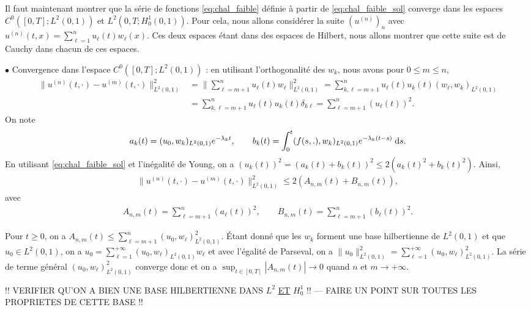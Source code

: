 \documentclass[12pt,a4paper,twoside]{article}
\begin{document}
Il faut maintenant montrer que la s\'erie de fonctions \eqref{eq:chal_faible}
d\'efinie \`a partir de \eqref{eq:chal_faible_sol} converge
dans les espaces $C^0([0,T];L^2(0,1))$ et $L^2(0,T;H^1_0(0,1))$.
Pour cela, nous allons consid\'erer la suite 
$(u^{(n)})_n$ avec $u^{(n)}(t,x) = \sum_{\ell=1}^n u_{\ell}(t) w_{\ell}(x)$. 
Ces deux espaces \'etant dans des espaces de Hilbert,
nous allons montrer que cette suite est de Cauchy dans chacun de ces espaces.

$\bullet$ Convergence dans l'espace $C^0([0,T];L^2(0,1))$ :
en utilisant l'orthogonalit\'e des $w_k$, nous avons pour $0 \leq m \leq n$,
\begin{align*}
  \| u^{(n)}(t,\cdot) - u^{(m)}(t,\cdot) \|_{L^2(0,1)}^2
  &= \| \sum_{\ell = m+1}^n u_{\ell}(t) w_{\ell} \|_{L^2(0,1)}^2
  = \sum_{k,\ell = m+1}^n u_{\ell}(t) u_{k}(t) (w_{\ell} , w_{k})_{L^2(0,1)}
  \\
  &= \sum_{k,\ell = m+1}^n u_{\ell}(t) u_{k}(t) \delta_{k \ell}
  = \sum_{\ell = m+1}^n (u_{\ell}(t))^2 .
\end{align*}
On note 
\begin{align*}
  a_k (t) = (u_0 , w_k)_{L^2(0,1)} e^{- \lambda_k t} , \qquad
  b_k(t) = \int_{0}^{t} (f(s,.),w_k)_{L^2(0,1)} e^{-\lambda_k(t-s)} \;\mathrm{d} s .
\end{align*}
En utilisant \eqref{eq:chal_faible_sol} et l'in\'egalit\'e de Young,
on a $(u_{k}(t))^2 = (a_k(t) + b_k(t))^2 \leq 2 (a_k(t)^2 + b_k(t)^2)$.
Ainsi,
\begin{align*}
  \| u^{(n)}(t,\cdot) - u^{(m)}(t,\cdot) \|_{L^2(0,1)}^2
  \leq 2(A_{n,m}(t) + B_{n,m}(t)) ,
\end{align*}
avec 
\begin{align*}
  A_{n,m}(t) = \sum_{\ell=m+1}^n (a_{\ell}(t))^2 , \qquad
  B_{n,m}(t) = \sum_{\ell=m+1}^n (b_{\ell}(t))^2 .
\end{align*}

Pour $t \geq 0$, on a $A_{n,m}(t) \leq \sum_{\ell = m+1}^n (u_0 , w_{\ell})_{L^2(0,1)}^2$.
\'Etant donn\'e que les $w_k$ forment une base hilbertienne de $L^2(0,1)$ et que
$u_0 \in L^2(0,1)$, on a $u_0 = \sum_{\ell = 1}^{+\infty} ( u_0, w_{\ell})_{L^2(0,1)} w_{\ell}$
et avec l'\'egalit\'e de Parseval, 
on a $\| u_0 \|_{L^2(0,1)}^2 = \sum_{\ell = 1}^{+\infty} ( u_0, w_{\ell})_{L^2(0,1)}^2$.
La s\'erie de terme g\'en\'eral $( u_0, w_{\ell})_{L^2(0,1)}^2$ converge donc
et on a $\sup_{t \in [0,T]} |A_{n,m}(t)| \to 0$ quand $n$ et $m \to +\infty$.


!! VERIFIER QU'ON A BIEN UNE BASE HILBERTIENNE DANS $L^2$ \underline{ET} $H^1_0$ !! 
--- FAIRE UN POINT SUR TOUTES LES PROPRIETES DE CETTE BASE !!
\end{document}

